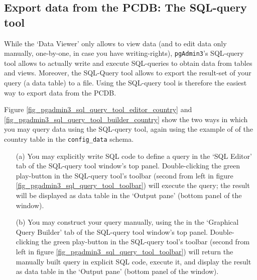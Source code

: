 \subsection{Export data from the PCDB: The SQL-query tool}\label{subsec_sql_query_tool}
While the `Data Viewer' only allows to view data (and to edit data only manually, one-by-one, in case you have writing-rights), \texttt{pgAdmin3}'s SQL-query tool allows to actually write and execute SQL-queries to obtain data from tables and views. 
Moreover, the SQL-Query tool allows to export the result-set of your query (a data table) to a file. 
Using the SQL-query tool is therefore the easiest way to export data from the PCDB.

Figure \ref{fig_pgadmin3_sql_query_tool_editor_country} and \ref{fig_pgadmin3_sql_query_tool_builder_country} show the two ways in which you may query data using the SQL-query tool, again using the example of of the country table in the \texttt{config\_data} schema.
\begin{itemize}
\item[(a)]{You may explicitly write SQL code to define a query in the `SQL Editor' tab of the SQL-query tool window's top panel. Double-clicking the green play-button in the SQL-query tool's toolbar (second from left in figure \ref{fig_pgadmin3_sql_query_tool_toolbar}) will execute the query; the result will be displayed as data table in the `Output pane' (bottom panel of the window).}
\item[(b)]{You may construct your query manually, using the in the `Graphical Query Builder' tab of the SQL-query tool window's top panel. Double-clicking the green play-button in the SQL-query tool's toolbar (second from left in figure \ref{fig_pgadmin3_sql_query_tool_toolbar}) will return the manually built query in explicit SQL code, execute it, and display the result as data table in the `Output pane' (bottom panel of the window).}
\end{itemize}

